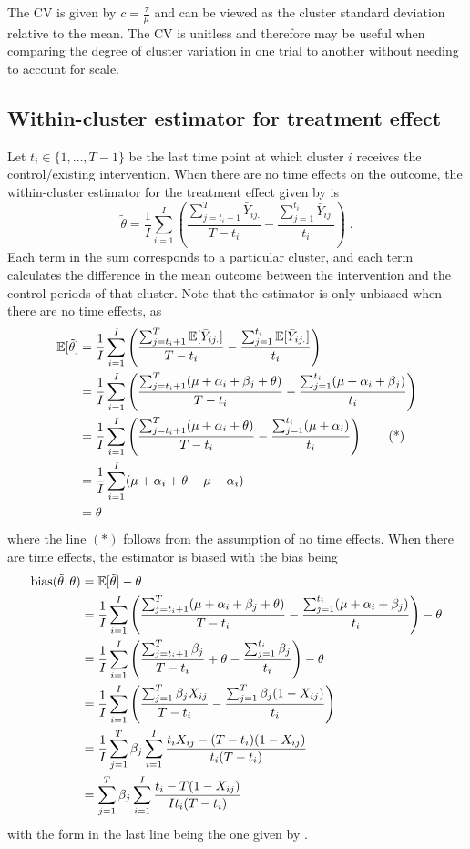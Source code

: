 \documentclass[10pt]{article}
\begin{document}
The CV is given by $c=\frac{\tau}{\mu}$ and can be viewed as the cluster standard deviation relative to the mean. The CV is unitless and therefore may be useful when comparing the degree of cluster variation in one trial to another without needing to account for scale.

\subsection{Within-cluster estimator for treatment effect} \label{apx:estimator}

Let $t_i\in\{1,\ldots,T-1\}$ be the last time point at which cluster $i$ receives the control/existing intervention. When there are no time effects on the outcome, the within-cluster estimator for the treatment effect given by \textcite{Hussey:2007} is
\[
\tilde{\theta} = \frac{1}{I}\sum_{i=1}^I\left(\frac{\sum_{j=t_i+1}^T\bar{Y}_{ij.}}{T-t_i} - \frac{\sum_{j=1}^{t_i}\bar{Y}_{ij.}}{t_i}\right)\;.
\]
Each term in the sum corresponds to a particular cluster, and each term calculates the difference in the mean outcome between the intervention and the control periods of that cluster. Note that the estimator is only unbiased when there are no time effects, as
\begin{align*}
\mathbb{E}[\tilde{\theta}] &= \frac{1}{I}\sum_{i=1}^I\left(\frac{\sum_{j=t_i+1}^T\mathbb{E}[\bar{Y}_{ij.}]}{T-t_i} - \frac{\sum_{j=1}^{t_i}\mathbb{E}[\bar{Y}_{ij.}]}{t_i}\right) \\
&= \frac{1}{I}\sum_{i=1}^I\left(\frac{\sum_{j=t_i+1}^T(\mu+\alpha_i+\beta_j+\theta)}{T-t_i} - \frac{\sum_{j=1}^{t_i}(\mu+\alpha_i+\beta_j)}{t_i}\right) \\
&= \frac{1}{I}\sum_{i=1}^I\left(\frac{\sum_{j=t_i+1}^T(\mu+\alpha_i+\theta)}{T-t_i} - \frac{\sum_{j=1}^{t_i}(\mu+\alpha_i)}{t_i}\right) \tag{*} \\
&= \frac{1}{I}\sum_{i=1}^I(\mu+\alpha_i+\theta-\mu-\alpha_i) \\
&= \theta
\end{align*}
where the line $(*)$ follows from the assumption of no time effects. When there are time effects, the estimator is biased with the bias being
\begin{align*}
\mathrm{bias}(\tilde{\theta},\theta) &= \mathbb{E}[\tilde{\theta}] - \theta \\
&= \frac{1}{I}\sum_{i=1}^I\left(\frac{\sum_{j=t_i+1}^T(\mu+\alpha_i+\beta_j+\theta)}{T-t_i} - \frac{\sum_{j=1}^{t_i}(\mu+\alpha_i+\beta_j)}{t_i}\right) - \theta \\
&= \frac{1}{I}\sum_{i=1}^I\left(\frac{\sum_{j=t_i+1}^T\beta_j}{T-t_i} + \theta - \frac{\sum_{j=1}^{t_i}\beta_j}{t_i}\right) - \theta \\
&= \frac{1}{I}\sum_{i=1}^I\left(\frac{\sum_{j=1}^T\beta_jX_{ij}}{T-t_i} - \frac{\sum_{j=1}^T\beta_j(1-X_{ij})}{t_i}\right) \\
&= \frac{1}{I}\sum_{j=1}^T\beta_j\sum_{i=1}^I\frac{t_iX_{ij} - (T-t_i)(1-X_{ij})}{t_i(T-t_i)} \\
&= \sum_{j=1}^T\beta_j\sum_{i=1}^I\frac{t_i - T(1-X_{ij})}{It_i(T-t_i)}
\end{align*}
with the form in the last line being the one given by \citeauthor{Hussey:2007}.
\end{document}

